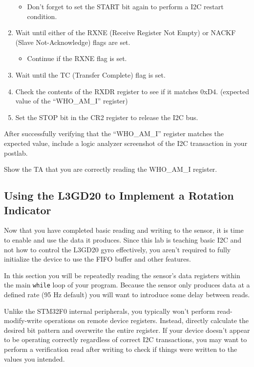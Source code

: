 \documentclass[openany,11pt,fleqn]{book} %
\begin{document}
\begin{exercise}
\begin{enumerate}
    \begin{itemize}
        \item Don't forget to set the START bit again to perform a I2C restart condition.
    \end{itemize}
    \item Wait until either of the RXNE (Receive Register Not Empty) or NACKF (Slave Not-Acknowledge) flags are set.
    \begin{itemize}
        \item Continue if the RXNE flag is set. 
    \end{itemize}
    \item Wait until the TC (Transfer Complete) flag is set.
    \item Check the contents of the RXDR register to see if it matches 0xD4. (expected value of the ``WHO\_AM\_I'' register) 
    \item Set the STOP bit in the CR2 register to release the I2C bus.
\end{enumerate}

After successfully verifying that the ``WHO\_AM\_I'' register matches the expected value, include a logic analyzer screenshot of the I2C transaction in your postlab.
\end{exercise}

\begin{assignment}
	Show the TA that you are correctly reading the WHO\_AM\_I register.
\end{assignment}
 
\subsection{\color{blue}Using the L3GD20 to Implement a Rotation Indicator}
Now that you have completed basic reading and writing to the sensor, it is time to enable and use the data it produces. Since this lab is teaching basic I2C and not how to control the L3GD20 gyro effectively, you aren't required to fully initialize the device to use the FIFO buffer and other features.

In this section you will be repeatedly reading the sensor's data registers within the main \texttt{while} loop of your program. Because the sensor only produces data at a defined rate (95 Hz default) you will want to introduce some delay between reads.

Unlike the STM32F0 internal peripherals, you typically won't perform read-modify-write operations on remote device registers. Instead, directly calculate the desired bit pattern and overwrite the entire register. If your device doesn't appear to be operating correctly regardless of correct I2C transactions, you may want to perform a verification read after writing to check if things were written to the values you intended. 
\end{document}
